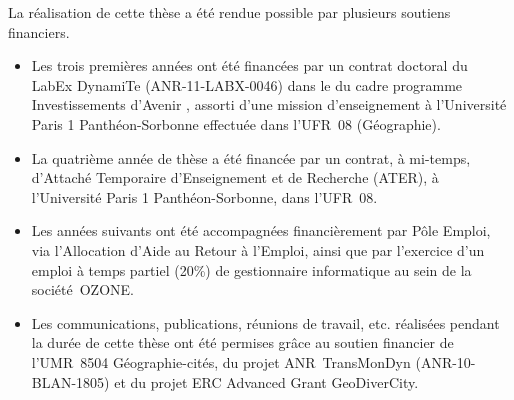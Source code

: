 \cleardoublepage

\vspace*{\fill}
{\small
La réalisation de cette thèse a été rendue possible par plusieurs soutiens financiers.
\begin{itemize}[noitemsep,leftmargin=*]
	\item Les trois premières années ont été financées par un contrat doctoral du LabEx DynamiTe (ANR-11-LABX-0046) dans le du cadre programme \og Investissements d'Avenir \fg{}, assorti d'une mission d'enseignement à l'Université Paris 1 Panthéon-Sorbonne effectuée dans l'UFR~08 (Géographie).
	\item La quatrième année de thèse a été financée par un contrat, à mi-temps, d'Attaché Temporaire d'Enseignement et de Recherche (ATER), à l'Université Paris 1 Panthéon-Sorbonne, dans l'UFR~08.
	\item Les années suivants ont été accompagnées financièrement par Pôle Emploi, via l'Allocation d'Aide au Retour à l'Emploi, ainsi que par l'exercice d'un emploi à temps partiel (20\%) de gestionnaire informatique au sein de la société~OZONE.
	\item Les communications, publications, réunions de travail, etc. réalisées pendant la durée de cette thèse ont été permises grâce au soutien financier de l'UMR~8504 Géographie-cités, du projet ANR~TransMonDyn (ANR-10-BLAN-1805) et du projet ERC Advanced Grant GeoDiverCity.
\end{itemize}
}